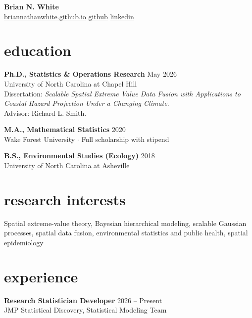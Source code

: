 \documentclass[11pt, letterpaper]{article}
\begin{document}
\begin{center}
  {\large\bfseries Brian N. White} \\[3pt]
  {\small\color{subtle}
    \href{https://briannathanwhite.github.io}{briannathanwhite.github.io} \quad
    \href{https://github.com/briannathanwhite}{github} \quad
    \href{https://www.linkedin.com/in/briannathanwhite}{linkedin}
  }
\end{center}

\section{education}

\textbf{Ph.D., Statistics \& Operations Research} \hfill May 2026 \\
{\color{subtle}University of North Carolina at Chapel Hill} \\
{\footnotesize Dissertation: \emph{Scalable Spatial Extreme Value Data Fusion with Applications to Coastal Hazard Projection Under a Changing Climate}.} \\
{\small Advisor: Richard L. Smith.}

\vspace{3pt}

\textbf{M.A., Mathematical Statistics} \hfill 2020 \\
{\color{subtle}Wake Forest University $\cdot$ Full scholarship with stipend}

\vspace{3pt}

\textbf{B.S., Environmental Studies (Ecology)} \hfill 2018 \\
{\color{subtle}University of North Carolina at Asheville}

\section{research interests}

{\small Spatial extreme-value theory, Bayesian hierarchical modeling, scalable Gaussian processes, spatial data fusion, environmental statistics and public health, spatial epidemiology}

\section{experience}

\textbf{Research Statistician Developer} \hfill 2026 -- Present \\
{\color{subtle}JMP Statistical Discovery, Statistical Modeling Team}
\end{document}
